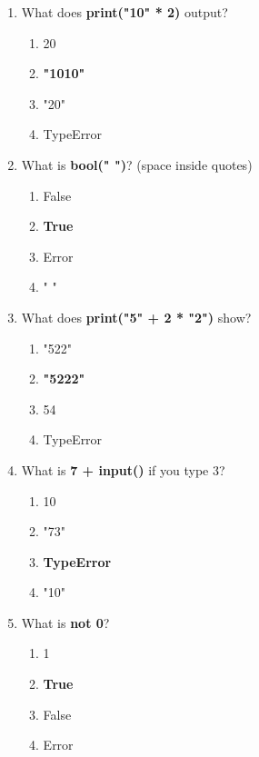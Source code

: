 \documentclass{article}
\begin{document}
\begin{multicols*}{4}
\begin{enumerate}
        \item What does \textbf{print("10" * 2)} output?
        \begin{enumerate}[label=(\Alph*)]
            \item 20
            \item \textbf{"1010"}
            \item "20"
            \item TypeError
        \end{enumerate}

        \item What is \textbf{bool(" ")}? (space inside quotes)
        \begin{enumerate}[label=(\Alph*)]
            \item False
            \item \textbf{True}
            \item Error
            \item " "
        \end{enumerate}

        \item What does \textbf{print("5" + 2 * "2")} show?
        \begin{enumerate}[label=(\Alph*)]
            \item "522"
            \item \textbf{"5222"}
            \item 54
            \item TypeError
        \end{enumerate}

        \item What is \textbf{7 + input()} if you type 3?
        \begin{enumerate}[label=(\Alph*)]
            \item 10
            \item "73"
            \item \textbf{TypeError}
            \item "10"
        \end{enumerate}

        \item What is \textbf{not 0}?
        \begin{enumerate}[label=(\Alph*)]
            \item 1
            \item \textbf{True}
            \item False
            \item Error
        \end{enumerate}


\end{enumerate}
\end{multicols*}
\end{document}
